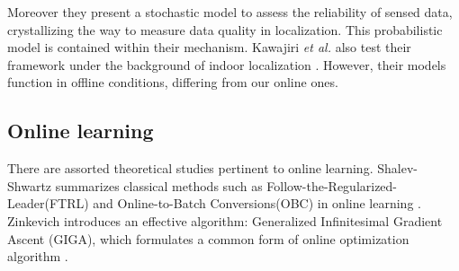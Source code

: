 \documentclass[10pt,conference,compsocconf,letterpaper]{IEEEtran}
\begin{document}
Moreover they present a stochastic model to assess the reliability of sensed data, crystallizing the way to measure data quality in localization. %
This probabilistic model is contained within their mechanism. Kawajiri \emph{et al.} also test their framework under the background of indoor localization \cite{Kawajiri2014Steered}. However, their models function in offline conditions, differing from our online ones. %

\subsection{Online learning}

There are assorted theoretical studies pertinent to online learning. Shalev-Shwartz summarizes classical methods such as Follow-the-Regularized-Leader(FTRL) and Online-to-Batch Conversions(OBC) in online learning  \cite{shalev2011online}. %
Zinkevich introduces an effective algorithm: Generalized Infinitesimal Gradient Ascent (GIGA), which formulates a common form of online optimization algorithm \cite{zinkevich2003online}. 
\end{document}
